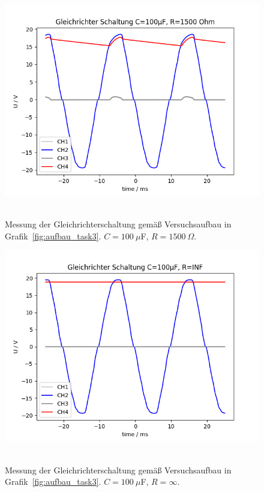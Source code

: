 \documentclass{article}
\begin{document}
\begin{figure}[H]
\caption{Messung der Gleichrichterschaltung gemäß Versuchsaufbau in Grafik~\ref{fig:aufbau_task3}. $C=100~\mu$F, $R=1500~\Omega$.}
\label{fig:grafik_task3_100_1500}
{\centering
\includegraphics[scale=0.6]{bilder/task3_100mu_R1500.png}
~
}
\end{figure}

\begin{figure}[H]
\caption{Messung der Gleichrichterschaltung gemäß Versuchsaufbau in Grafik~\ref{fig:aufbau_task3}. $C=100~\mu$F, $R=\infty$.}
\label{fig:grafik_task3_100_inf}
{\centering
\includegraphics[scale=0.6]{bilder/task3_100mu_Rinf.png}
~
}
\end{figure}
\end{document}
